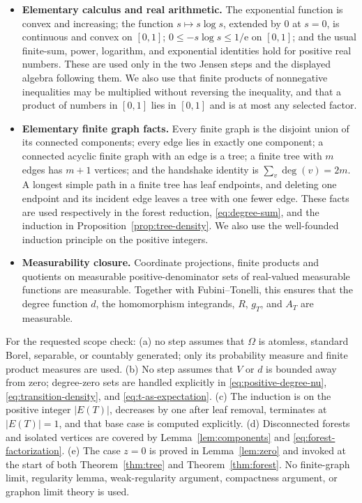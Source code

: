 \documentclass[11pt]{article}
\begin{document}
\begin{itemize}
\item \textbf{Elementary calculus and real arithmetic.}
The exponential function is convex and increasing; the function
$s\mapsto s\log s$, extended by $0$ at $s=0$, is continuous and convex
on $[0,1]$; $0\leq-s\log s\leq1/\mathrm{e}$ on $[0,1]$; and the usual
finite-sum, power, logarithm, and exponential identities hold for
positive real numbers.  These are used only in the two Jensen steps and
the displayed algebra following them.  We also use that finite products
of nonnegative inequalities may be multiplied without reversing the
inequality, and that a product of numbers in $[0,1]$ lies in $[0,1]$
and is at most any selected factor.

\item \textbf{Elementary finite graph facts.}
Every finite graph is the disjoint union of its connected components;
every edge lies in exactly one component; a connected acyclic finite
graph with an edge is a tree; a finite tree with $m$ edges has $m+1$
vertices; and the handshake identity is
$\sum_v\deg(v)=2m$.  A longest simple path in a finite tree has leaf
endpoints, and deleting one endpoint and its incident edge leaves a tree
with one fewer edge.  These facts are used respectively in the forest
reduction, \eqref{eq:degree-sum}, and the induction in
Proposition~\ref{prop:tree-density}.  We also use the well-founded
induction principle on the positive integers.

\item \textbf{Measurability closure.}
Coordinate projections, finite products and quotients on measurable
positive-denominator sets of real-valued measurable functions are
measurable.  Together with Fubini--Tonelli, this ensures that the degree
function $d$, the homomorphism integrands, $R$, $g_T$, and $A_T$ are
measurable.
\end{itemize}

For the requested scope check: (a) no step assumes that $\Omega$ is
atomless, standard Borel, separable, or countably generated; only its
probability measure and finite product measures are used.  (b) No step
assumes that $V$ or $d$ is bounded away from zero; degree-zero sets are
handled explicitly in \eqref{eq:positive-degree-nu},
\eqref{eq:transition-density}, and \eqref{eq:t-as-expectation}.
(c) The induction is on the positive integer $|E(T)|$, decreases by one
after leaf removal, terminates at $|E(T)|=1$, and that base case is
computed explicitly.  (d) Disconnected forests and isolated vertices
are covered by Lemma~\ref{lem:components} and
\eqref{eq:forest-factorization}.  (e) The case $z=0$ is proved in
Lemma~\ref{lem:zero} and invoked at the start of both
Theorem~\ref{thm:tree} and Theorem~\ref{thm:forest}.  No finite-graph
limit, regularity lemma, weak-regularity argument, compactness argument,
or graphon limit theory is used.
\end{document}
